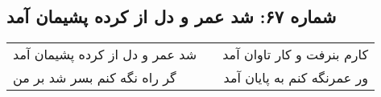 \begin{center}
\section*{شماره ۶۷: شد عمر و دل از کرده پشیمان آمد}
\label{sec:067}
\begin{longtable}{l p{0.5cm} r}
شد عمر و دل از کرده پشیمان آمد
&&
کارم بنرفت و کار تاوان آمد
\\
گر راه نگه کنم بسر شد بر من
&&
ور عمرنگه کنم به پایان آمد
\\
\end{longtable}
\end{center}
